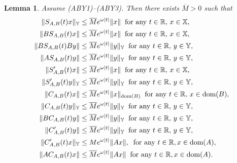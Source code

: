 \documentclass[11pt]{amsart}
\numberwithin{equation}{section}
\newcommand{\SAB}{S_{A,B}}
\newcommand{\CAB}{C_{A,B}}
\newtheorem{lemma}[theorem]{Lemma}
\theoremstyle{remark}
\theoremstyle{definition}
\newcommand\bX{{\mathbb X}}
\newcommand\bY{{\mathbb Y}}
\newcommand{\dom}{\text{\rm{dom}}}
\begin{document}
\begin{lemma}\label{l4.5}
	Assume \textnormal{(ABY1)--(ABY3)}. Then there exists $\overline{M} > 0$ such that
	\begin{align}
		\|\SAB(t)x\|_\bY &\leq \overline{M}e^{\omega|t|}\|x\|\;\;\text{for any } t \in \mathbb{R},\, x \in \bX,\label{SAB-XY} \\
		\|B\SAB(t)x\| &\leq \overline{M}e^{\omega|t|}\|x\| \;\;\text{for any } t \in \mathbb{R},\, x \in \bX, \label{BSAB-XX}\\
		\|B\SAB(t)By\| &\leq \overline{M}e^{\omega|t|}\|y\|_\bY \;\;\text{for any } t \in \mathbb{R},\, y \in \bY, \label{BSABB-YX}\\
		\|A\SAB(t)y\| &\leq \overline{M}e^{\omega|t|}\|y\|_\bY\;\;\text{for any } t \in \mathbb{R},\, y \in \bY, \label{ASAB-YX}\\
		\|S_{A,B}'(t)x\| &\leq \overline{M}e^{\omega|t|}\|x\|\;\;\text{for any } t \in \mathbb{R},\, x \in \bX, \label{SAB-prime-XX} \\
		\|S_{A,B}'(t)y\|_\bY &\leq \overline{M}e^{\omega|t|}\|y\|_\bY\;\;\text{for any } t \in \mathbb{R},\, y \in \bY, \label{SAB-prime-YY} \\
		\|\CAB(t)x\| &\leq \overline{M}e^{\omega|t|}\|x\|_{\dom(B)}\;\;\text{for any } t \in \mathbb{R},\, x \in \dom(B), \label{CAB-XX}\\
		\|\CAB(t)y\|_\bY &\leq \overline{M}e^{\omega|t|}\|y\|_\bY\;\;\text{for any } t \in \mathbb{R},\, y \in \bY, \label{CAB-YY}\\
		\|B\CAB(t)y\| &\leq \overline{M}e^{\omega|t|}\|y\|_\bY\;\;\text{for any } t \in \mathbb{R},\, y \in \bY, \label{BCAB-YX}\\
		\|C_{A,B}'(t)y\| &\leq \overline{M}e^{\omega|t|}\|y\|_\bY\;\;\text{for any } t \in \mathbb{R},\, y \in \bY\label{CAB-prime-YX},\\
		\|C_{A,B}'(t)x\|_\bY &\leq Me^{\omega|t|}\|Ax\|, \;\;\text{for any } t \in \mathbb{R}, x \in \dom(A)\label{CAB-prime-domainAY},\\
		\|A\CAB(t)x\| &\leq \overline{M}e^{\omega|t|}\|Ax\|\;\;\text{for any } t \in \mathbb{R}, x \in \dom(A)\label{ACAB-prime-domainAX}.
	\end{align}
\end{lemma}
\end{document}
